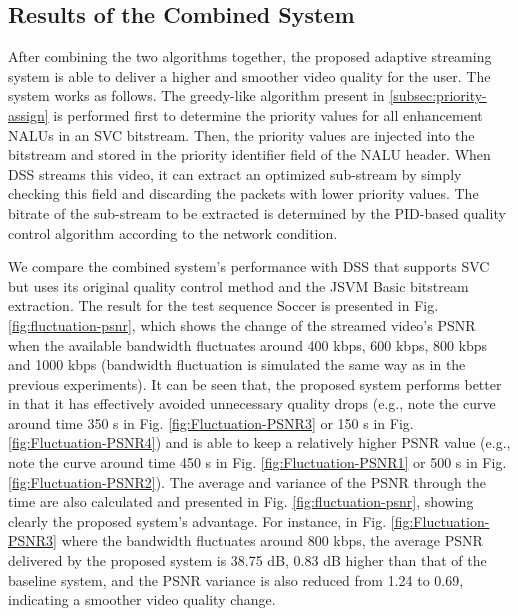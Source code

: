 \documentclass[journal,draftclsnofoot,onecolumn]{IEEEtran}
\begin{document}
\subsection{Results of the Combined System}
\label{subsec:exp-combined}

After combining the two algorithms together, the proposed adaptive streaming system is able to deliver a higher and smoother video quality for the user. The system works as follows. The greedy-like algorithm present in \ref{subsec:priority-assign} is performed first to determine the priority values for all enhancement NALUs in an SVC bitstream. Then, the priority values are injected into the bitstream and stored in the priority identifier field of the NALU header. When DSS streams this video, it can extract an optimized sub-stream by simply checking this field and discarding the packets with lower priority values. The bitrate of the sub-stream to be extracted is determined by the PID-based quality control algorithm according to the network condition.

We compare the combined system's performance with DSS that supports SVC but uses its original quality control method and the JSVM Basic bitstream extraction. The result for the test sequence Soccer is presented in Fig. \ref{fig:fluctuation-psnr}, which shows the change of the streamed video's PSNR when the available bandwidth fluctuates around 400 kbps, 600 kbps, 800 kbps and 1000 kbps (bandwidth fluctuation is simulated the same way as in the previous experiments). It can be seen that, the proposed system performs better in that it has effectively avoided unnecessary quality drops (e.g., note the curve around time 350 s in Fig. \ref{fig:Fluctuation-PSNR3} or 150 s in Fig. \ref{fig:Fluctuation-PSNR4}) and is able to keep a relatively higher PSNR value (e.g., note the curve around time 450 s in Fig. \ref{fig:Fluctuation-PSNR1} or 500 s in Fig. \ref{fig:Fluctuation-PSNR2}). The average and variance of the PSNR through the time are also calculated and presented in Fig. \ref{fig:fluctuation-psnr}, showing clearly the proposed system's advantage. For instance, in Fig. \ref{fig:Fluctuation-PSNR3} where the bandwidth fluctuates around 800 kbps, the average PSNR delivered by the proposed system is 38.75 dB, 0.83 dB higher than that of the baseline system, and the PSNR variance is also reduced from 1.24 to 0.69, indicating a smoother video quality change.
\end{document}

